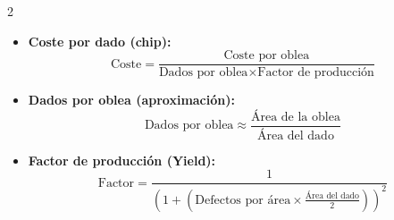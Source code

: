 \documentclass[11pt, a4paper]{article}
\begin{document}
\begin{multicols*}{2}
        \begin{tcolorbox}[
        colback=white, 
        colframe=blue!40!black, 
        title= {\centering \textbf{Coste de Fabricación de Circuitos Integrados} },
        fonttitle=\bfseries,
        size=small
        ]
        \begin{itemize}
            \item \textbf{Coste por dado (chip):}
            $$\text{Coste} = \frac{\text{Coste por oblea}}{\text{Dados por oblea} \times \text{Factor de producción}}$$
            \item \textbf{Dados por oblea (aproximación):}
            $$\text{Dados por oblea} \approx \frac{\text{Área de la oblea}}{\text{Área del dado}}$$
            \item \textbf{Factor de producción (Yield):}
            $$\text{Factor} = \frac{1}{\left(1 + \left(\text{Defectos por área} \times \frac{\text{Área del dado}}{2}\right)\right)^2}$$
        \end{itemize}
        \end{tcolorbox}
        
    \end{multicols*}
\end{document}
